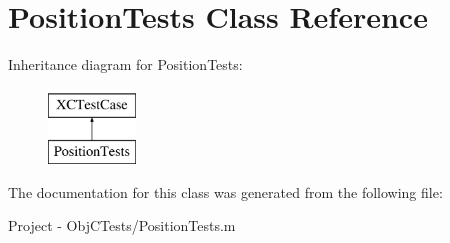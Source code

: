 \hypertarget{interface_position_tests}{}\section{Position\+Tests Class Reference}
\label{interface_position_tests}
Inheritance diagram for Position\+Tests\+:\begin{figure}[H]
\begin{center}
\leavevmode
\includegraphics[height=2.000000cm]{interface_position_tests}
\end{center}
\end{figure}


The documentation for this class was generated from the following file\+:\begin{DoxyCompactItemize}
\item 
Project -\/ Obj\+C\+Tests/Position\+Tests.\+m\end{DoxyCompactItemize}
